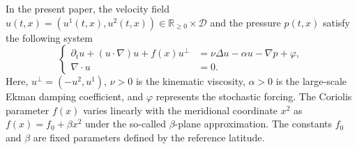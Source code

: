 \documentclass[11pt,a4paper]{article}
\numberwithin{equation}{section}
\numberwithin{theorem}{section}
\numberwithin{remark}{section}
\numberwithin{definition}{section}
\begin{document}
In the present paper, the velocity field $u(t,x)=(u^1(t,x),u^2(t,x)) \in \mathbb{R}_{\geq 0} \times \mathcal{D}$ and the pressure $p(t,x)$ satisfy the following system
\begin{equation}\label{eq:NS_intro}
\left\{
    \begin{array}{rl}
    \partial_t u + (u \cdot \nabla)u + f(x) u^\perp &= \nu \Delta u - \alpha u - \nabla p + \varphi, \\
    \nabla \cdot u &= 0.
\end{array}
\right.
\end{equation}
Here, $u^\perp = (-u^2, u^1)$, $\nu > 0$ is the kinematic viscosity, $\alpha > 0$ is the large-scale Ekman damping coefficient, and $\varphi$ represents the stochastic forcing. The Coriolis parameter $f(x)$ varies linearly with the meridional coordinate $x^2$ as $f(x) = f_0 + \beta x^2$ under the so-called $\beta$-plane approximation. The constants $f_0$ and $\beta$ are fixed parameters defined by the reference latitude.
\end{document}
